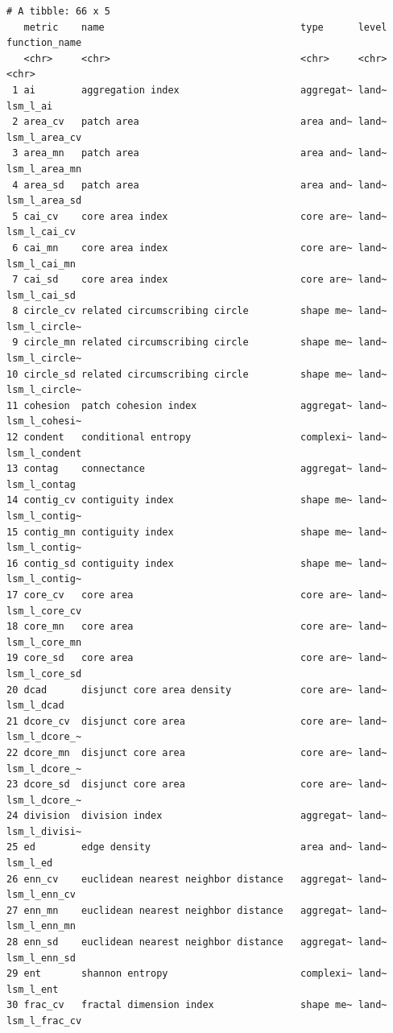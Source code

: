 \documentclass[
  letterpaper,
  DIV=11,
  numbers=noendperiod]{scrartcl}
\begin{document}
\begin{verbatim}
# A tibble: 66 x 5
   metric    name                                  type      level function_name
   <chr>     <chr>                                 <chr>     <chr> <chr>        
 1 ai        aggregation index                     aggregat~ land~ lsm_l_ai     
 2 area_cv   patch area                            area and~ land~ lsm_l_area_cv
 3 area_mn   patch area                            area and~ land~ lsm_l_area_mn
 4 area_sd   patch area                            area and~ land~ lsm_l_area_sd
 5 cai_cv    core area index                       core are~ land~ lsm_l_cai_cv 
 6 cai_mn    core area index                       core are~ land~ lsm_l_cai_mn 
 7 cai_sd    core area index                       core are~ land~ lsm_l_cai_sd 
 8 circle_cv related circumscribing circle         shape me~ land~ lsm_l_circle~
 9 circle_mn related circumscribing circle         shape me~ land~ lsm_l_circle~
10 circle_sd related circumscribing circle         shape me~ land~ lsm_l_circle~
11 cohesion  patch cohesion index                  aggregat~ land~ lsm_l_cohesi~
12 condent   conditional entropy                   complexi~ land~ lsm_l_condent
13 contag    connectance                           aggregat~ land~ lsm_l_contag 
14 contig_cv contiguity index                      shape me~ land~ lsm_l_contig~
15 contig_mn contiguity index                      shape me~ land~ lsm_l_contig~
16 contig_sd contiguity index                      shape me~ land~ lsm_l_contig~
17 core_cv   core area                             core are~ land~ lsm_l_core_cv
18 core_mn   core area                             core are~ land~ lsm_l_core_mn
19 core_sd   core area                             core are~ land~ lsm_l_core_sd
20 dcad      disjunct core area density            core are~ land~ lsm_l_dcad   
21 dcore_cv  disjunct core area                    core are~ land~ lsm_l_dcore_~
22 dcore_mn  disjunct core area                    core are~ land~ lsm_l_dcore_~
23 dcore_sd  disjunct core area                    core are~ land~ lsm_l_dcore_~
24 division  division index                        aggregat~ land~ lsm_l_divisi~
25 ed        edge density                          area and~ land~ lsm_l_ed     
26 enn_cv    euclidean nearest neighbor distance   aggregat~ land~ lsm_l_enn_cv 
27 enn_mn    euclidean nearest neighbor distance   aggregat~ land~ lsm_l_enn_mn 
28 enn_sd    euclidean nearest neighbor distance   aggregat~ land~ lsm_l_enn_sd 
29 ent       shannon entropy                       complexi~ land~ lsm_l_ent    
30 frac_cv   fractal dimension index               shape me~ land~ lsm_l_frac_cv

\end{verbatim}
\end{document}
